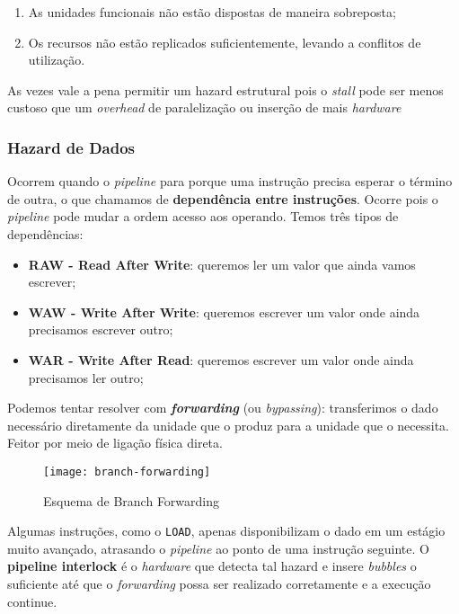 \begin{enumerate}
  \item As unidades funcionais não estão dispostas de maneira sobreposta;

  \item Os recursos não estão replicados suficientemente, levando a conflitos de utilização.
\end{enumerate}

As vezes vale a pena permitir um hazard estrutural pois o \textit{stall} pode ser menos custoso que um \textit{overhead} de paralelização ou inserção de mais \textit{hardware}




\subsubsection{Hazard de Dados}
Ocorrem quando o \textit{pipeline} para porque uma instrução precisa esperar o término de outra, o que chamamos de \textbf{dependência entre instruções}. Ocorre pois o \textit{pipeline} pode mudar a ordem acesso aos operando. Temos três tipos de dependências:

\begin{itemize}
  \item \textbf{\textsc{RAW} - Read After Write}: queremos ler um valor que ainda vamos escrever;

  \item \textbf{\textsc{WAW} - Write After Write}: queremos escrever um valor onde ainda precisamos escrever outro;

  \item \textbf{\textsc{WAR} - Write After Read}: queremos escrever um valor onde ainda precisamos ler outro;
\end{itemize}

Podemos tentar resolver com \textbf{\textit{forwarding}} (ou \textit{bypassing}): transferimos o dado necessário diretamente da unidade que o produz para a unidade que o necessita. Feitor por meio de ligação física direta.

\begin{figure}
  \texttt{[image: branch-forwarding]}
  \label{fig:branch-forwarding}
  \caption{Esquema de Branch Forwarding}
\end{figure}

Algumas instruções, como o \texttt{LOAD}, apenas disponibilizam o dado em um estágio muito avançado, atrasando o \textit{pipeline} ao ponto de uma instrução seguinte. O \textbf{pipeline interlock} é o \textit{hardware} que detecta tal hazard e insere \textit{bubbles} o suficiente até que o \textit{forwarding} possa ser realizado corretamente e a execução continue.

